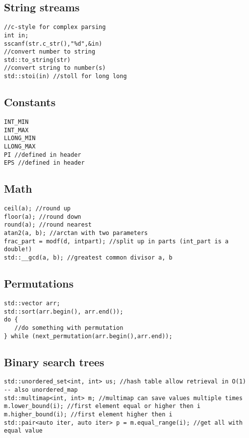 \subsection{String streams}
\begin{verbatim}
//c-style for complex parsing
int in;
sscanf(str.c_str(),"%d",&in)
//convert number to string
std::to_string(str)
//convert string to number(s)
std::stoi(in) //stoll for long long
\end{verbatim}

\subsection{Constants}
\begin{verbatim}
INT_MIN
INT_MAX
LLONG_MIN
LLONG_MAX
PI //defined in header
EPS //defined in header
\end{verbatim}

\subsection{Math}
\begin{verbatim}
ceil(a); //round up
floor(a); //round down
round(a); //round nearest
atan2(a, b); //arctan with two parameters
frac_part = modf(d, intpart); //split up in parts (int_part is a double!)
std::__gcd(a, b); //greatest common divisor a, b
\end{verbatim}

\subsection{Permutations}
\begin{verbatim}
std::vector arr;
std::sort(arr.begin(), arr.end());
do {
   //do something with permutation
} while (next_permutation(arr.begin(),arr.end));
\end{verbatim}

\subsection{Binary search trees}
\begin{verbatim}
std::unordered_set<int, int> us; //hash table allow retrieval in O(1) -- also unordered_map 
std::multimap<int, int> m; //multimap can save values multiple times
m.lower_bound(i); //first element equal or higher then i
m.higher_bound(i); //first element higher then i
std::pair<auto iter, auto iter> p = m.equal_range(i); //get all with equal value
\end{verbatim} 

